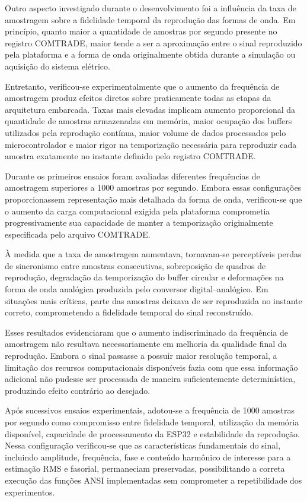 Outro aspecto investigado durante o desenvolvimento foi a influência da taxa de amostragem sobre a fidelidade temporal da reprodução das formas de onda. Em princípio, quanto maior a quantidade de amostras por segundo presente no registro COMTRADE, maior tende a ser a aproximação entre o sinal reproduzido pela plataforma e a forma de onda originalmente obtida durante a simulação ou aquisição do sistema elétrico.

Entretanto, verificou-se experimentalmente que o aumento da frequência de amostragem produz efeitos diretos sobre praticamente todas as etapas da arquitetura embarcada. Taxas mais elevadas implicam aumento proporcional da quantidade de amostras armazenadas em memória, maior ocupação dos buffers utilizados pela reprodução contínua, maior volume de dados processados pelo microcontrolador e maior rigor na temporização necessária para reproduzir cada amostra exatamente no instante definido pelo registro COMTRADE.

Durante os primeiros ensaios foram avaliadas diferentes frequências de amostragem superiores a 1000 amostras por segundo. Embora essas configurações proporcionassem representação mais detalhada da forma de onda, verificou-se que o aumento da carga computacional exigida pela plataforma comprometia progressivamente sua capacidade de manter a temporização originalmente especificada pelo arquivo COMTRADE.

À medida que a taxa de amostragem aumentava, tornavam-se perceptíveis perdas de sincronismo entre amostras consecutivas, sobreposição de quadros de reprodução, degradação da temporização do buffer circular e deformações na forma de onda analógica produzida pelo conversor digital--analógico. Em situações mais críticas, parte das amostras deixava de ser reproduzida no instante correto, comprometendo a fidelidade temporal do sinal reconstruído.

Esses resultados evidenciaram que o aumento indiscriminado da frequência de amostragem não resultava necessariamente em melhoria da qualidade final da reprodução. Embora o sinal passasse a possuir maior resolução temporal, a limitação dos recursos computacionais disponíveis fazia com que essa informação adicional não pudesse ser processada de maneira suficientemente determinística, produzindo efeito contrário ao desejado.

Após sucessivos ensaios experimentais, adotou-se a frequência de 1000 amostras por segundo como compromisso entre fidelidade temporal, utilização da memória disponível, capacidade de processamento da ESP32 e estabilidade da reprodução. Nessa configuração verificou-se que as características fundamentais do sinal, incluindo amplitude, frequência, fase e conteúdo harmônico de interesse para a estimação RMS e fasorial, permaneciam preservadas, possibilitando a correta execução das funções ANSI implementadas sem comprometer a repetibilidade dos experimentos.

